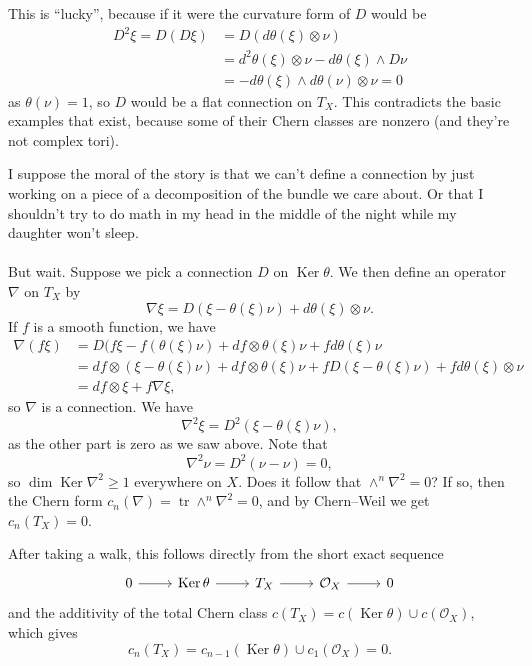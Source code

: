 \documentclass[11pt]{amsart}
\theoremstyle{definition}
\newcommand{\cc}[1]{\mathcal{#1}}
\DeclareMathOperator{\Ker}{Ker}
\DeclareMathOperator{\tr}{tr}
\begin{document}
This is ``lucky'', because if it were the curvature form of $D$ would be
\begin{align*}
D^2 \xi
= D(D\xi)
&= D(d \theta(\xi) \otimes \nu)
\\
&= d^2 \theta(\xi) \otimes \nu - d\theta(\xi) \wedge D\nu
\\
&= - d\theta(\xi) \wedge d\theta(\nu) \otimes \nu
= 0
\end{align*}
as $\theta(\nu) = 1$, so $D$ would be a flat connection on $T_X$. This contradicts the basic examples that exist, because some of their Chern classes are nonzero (and they're not complex tori).

I suppose the moral of the story is that we can't define a connection by just working on a piece of a decomposition of the bundle we care about. Or that I shouldn't try to do math in my head in the middle of the night while my daughter won't sleep.


\paragraph{}

But wait. Suppose we pick a connection $D$ on $\Ker \theta$. We then define an operator $\nabla$ on $T_X$ by
\[
\nabla \xi
= D(\xi - \theta(\xi) \nu) + d\theta(\xi) \otimes \nu.
\]
If $f$ is a smooth function, we have
\begin{align*}
\nabla(f \xi)
&= D(f\xi - f(\theta(\xi) \nu) + df \otimes \theta(\xi) \nu + f d\theta(\xi) \nu
\\
&= df \otimes (\xi - \theta(\xi) \nu) + df \otimes \theta(\xi) \nu + f D(\xi - \theta(\xi) \nu) + f d\theta(\xi) \otimes \nu
\\
&=
df \otimes \xi + f \nabla \xi,
\end{align*}
so $\nabla$ is a connection. We have
\[
\nabla^2 \xi = D^2(\xi - \theta(\xi) \nu),
\]
as the other part is zero as we saw above. Note that
\[
\nabla^2 \nu = D^2(\nu - \nu) = 0,
\]
so $\dim \Ker \nabla^2 \geq 1$ everywhere on $X$. Does it follow that $\wedge^n \nabla^2 = 0$? If so, then the Chern form $c_n(\nabla) = \tr \wedge^n \nabla^2 = 0$, and by Chern--Weil we get $c_n(T_X) = 0$.

After taking a walk, this follows directly from the short exact sequence
\[
\begin{tikzcd}
0 \ar[r] &
\Ker \theta \ar[r] &
T_X \ar[r] &
\cc O_X \ar[r] &
0
\end{tikzcd}
\]
and the additivity of the total Chern class $c(T_X) = c(\Ker \theta) \cup c(\cc O_X)$, which gives
\[
c_n(T_X) = c_{n-1}(\Ker \theta) \cup c_1(\cc O_X) = 0.
\]
\end{document}
